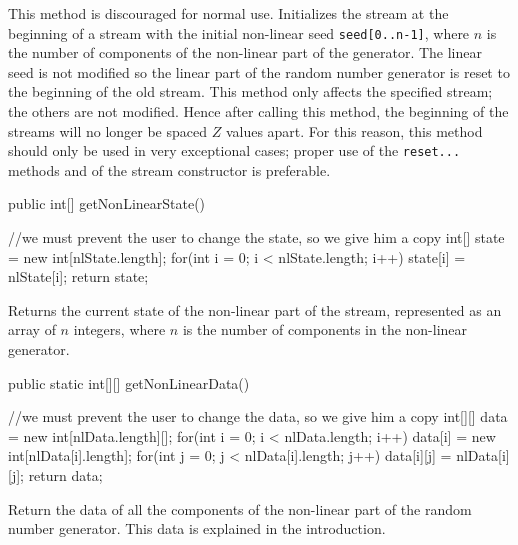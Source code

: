 \begin{tabb} This method is discouraged for normal use.
  Initializes the stream at the beginning of a stream with the initial
  non-linear seed \texttt{seed[0..n-1]}, where $n$ is the number of components
  of the non-linear part of the generator.
  The linear seed is not modified so the linear part of the random number
  generator is reset to the beginning of the old stream.
  This method only affects the specified stream; the others are not
  modified. Hence after calling this method, the beginning of the streams
  will no longer be spaced $Z$ values apart.
  For this reason, this method should only be used in very exceptional cases;
  proper use of the \texttt{reset...} methods and of the stream constructor is
  preferable.
\end{tabb}
\begin{htmlonly}
\end{htmlonly}
\begin{code}

   public int[] getNonLinearState() \begin{hide} {
      //we must prevent the user to change the state, so we give him a copy
      int[] state = new int[nlState.length];
      for(int i = 0; i < nlState.length; i++)
         state[i] = nlState[i];
      return state;
   } \end{hide}
\end{code}
\begin{tabb} Returns the current state of the non-linear part of the stream,
  represented as an array of $n$ integers, where $n$ is the number
  of components in the non-linear generator.
\end{tabb}
\begin{htmlonly}
\end{htmlonly}
\begin{code}

   public static int[][] getNonLinearData() \begin{hide} {
      //we must prevent the user to change the data, so we give him a copy
      int[][] data = new int[nlData.length][];
      for(int i = 0; i < nlData.length; i++) {
         data[i] = new int[nlData[i].length];
         for(int j = 0; j < nlData[i].length; j++)
            data[i][j] = nlData[i][j];
      }
      return data;
   } \end{hide}
\end{code}
\begin{tabb} Return the data of all the components of the non-linear
  part of the random number generator. This data is explained in the
  introduction.
\end{tabb}
